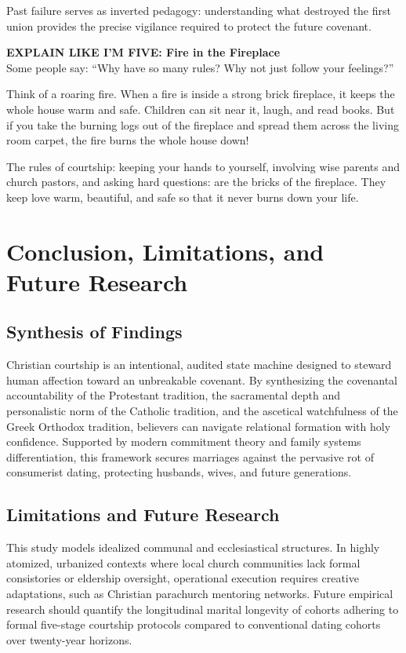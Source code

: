 \documentclass[11pt,twocolumn]{article}
\begin{document}
Past failure serves as inverted pedagogy: understanding what destroyed the first union provides the precise vigilance required to protect the future covenant.

\begin{eli5box}
\textbf{EXPLAIN LIKE I'M FIVE: Fire in the Fireplace}\\
Some people say: ``Why have so many rules? Why not just follow your feelings?'' 

Think of a roaring fire. When a fire is inside a strong brick fireplace, it keeps the whole house warm and safe. Children can sit near it, laugh, and read books. But if you take the burning logs out of the fireplace and spread them across the living room carpet, the fire burns the whole house down! 

The rules of courtship: keeping your hands to yourself, involving wise parents and church pastors, and asking hard questions: are the bricks of the fireplace. They keep love warm, beautiful, and safe so that it never burns down your life.
\end{eli5box}

\section{Conclusion, Limitations, and Future Research}

\subsection{Synthesis of Findings}
Christian courtship is an intentional, audited state machine designed to steward human affection toward an unbreakable covenant. By synthesizing the covenantal accountability of the Protestant tradition, the sacramental depth and personalistic norm of the Catholic tradition, and the ascetical watchfulness of the Greek Orthodox tradition, believers can navigate relational formation with holy confidence. Supported by modern commitment theory and family systems differentiation, this framework secures marriages against the pervasive rot of consumerist dating, protecting husbands, wives, and future generations.

\subsection{Limitations and Future Research}
This study models idealized communal and ecclesiastical structures. In highly atomized, urbanized contexts where local church communities lack formal consistories or eldership oversight, operational execution requires creative adaptations, such as Christian parachurch mentoring networks. Future empirical research should quantify the longitudinal marital longevity of cohorts adhering to formal five-stage courtship protocols compared to conventional dating cohorts over twenty-year horizons.
\end{document}

